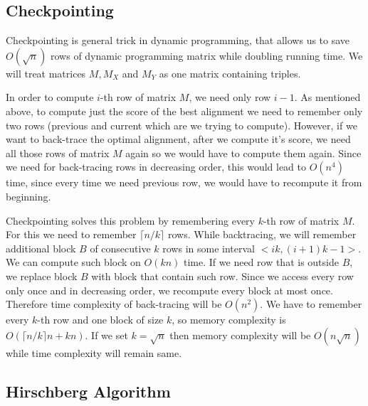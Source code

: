 




\subsection{Checkpointing}

Checkpointing is general trick in dynamic programming, that allows us to save
$O(\sqrt n)$ rows of dynamic programming matrix while doubling running time.
We will treat matrices $M,M_X$ and $M_Y$ as one matrix containing triples.

In order to compute $i$-th row of matrix $M$, we need only row
$i-1$. As mentioned above, to compute just the score of the best alignment we
need to remember only two rows (previous and current which are we trying to
compute). However, if we want to back-trace the optimal alignment, after we
compute it's score, we need all those rows of matrix $M$ again so we would have
to compute them again. Since we need for back-tracing rows in decreasing order,
this would lead to $O(n^4)$ time, since every time we need previous row, we
would have to recompute it from beginning.

Checkpointing solves this problem by remembering every $k$-th row of matrix $M$.
For this we need to remember $\lceil n/k\rceil$ rows.
While backtracing, we will remember additional block $B$ of consecutive $k$ rows in
some interval $<ik,(i+1)k-1>$. We can compute such block on $O(kn)$ time. 
If we need row that is outside $B$, we replace block $B$ with block that contain
such row. Since we access every row only once and in decreasing order, we
recompute every block at most once. Therefore time complexity of back-tracing
will be $O(n^2)$. We have to remember every $k$-th row and one block of size
$k$, so memory complexity is $O(\lceil n/k\rceil n+ kn)$. If we set $k=\sqrt n$
then memory complexity will be $O(n\sqrt n)$ while time complexity will remain
same.


\subsection{Hirschberg Algorithm}

